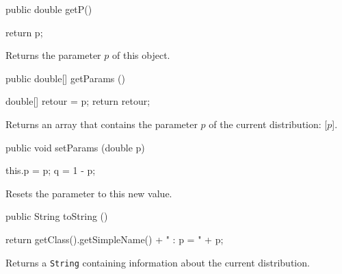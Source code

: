 \begin{htmlonly}
\end{htmlonly}
\begin{code}

   public double getP()\begin{hide} {
      return p;
   }\end{hide}
\end{code}
\begin{tabb}
   Returns the parameter $p$ of this object.
\end{tabb}
\begin{code}

   public double[] getParams ()\begin{hide} {
      double[] retour = {p};
      return retour;
   }\end{hide}
\end{code}
\begin{tabb}
   Returns an array that contains the parameter $p$ of the current
   distribution: [$p$].
\end{tabb}
\begin{code}

   public void setParams (double p)\begin{hide} {
      this.p = p;
      q = 1 - p;
   }\end{hide}
\end{code}
\begin{tabb}
   Resets the parameter to this new value.
\end{tabb}
\begin{hide}\begin{code}

   public String toString ()\begin{hide} {
      return getClass().getSimpleName() + " : p = " + p;
   }\end{hide}
\end{code}
\begin{tabb}
   Returns a \texttt{String} containing information about the current distribution.
\end{tabb}\end{hide}
\begin{code}\begin{hide}
}\end{hide}
\end{code}
